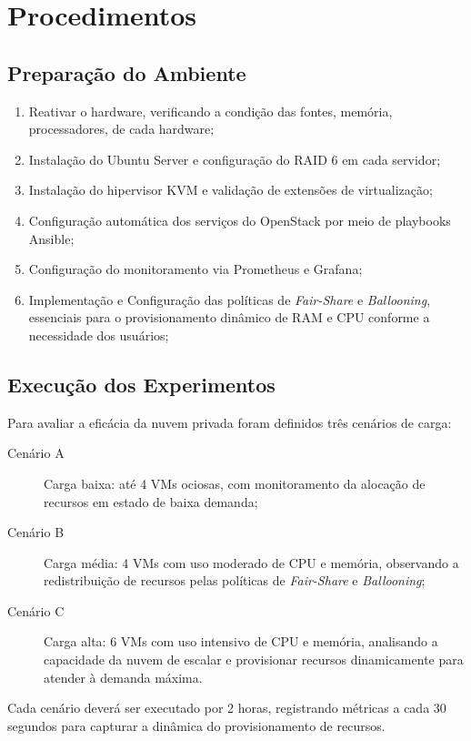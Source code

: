 \section{Procedimentos}
\subsection{Preparação do Ambiente}
\begin{enumerate}
    \item Reativar o hardware, verificando a condição das fontes, memória, processadores, de cada hardware;
    \item Instalação do Ubuntu Server e configuração do RAID 6 em cada servidor;
    \item Instalação do hipervisor KVM e validação de extensões de virtualização;
    \item Configuração automática dos serviços do OpenStack por meio de playbooks Ansible;
    \item Configuração do monitoramento via Prometheus e Grafana;
    \item Implementação e Configuração das políticas de \textit{Fair-Share} e \textit{Ballooning}, essenciais para o provisionamento dinâmico de RAM e CPU conforme a necessidade dos usuários;
\end{enumerate}

\subsection{Execução dos Experimentos}
Para avaliar a eficácia da nuvem privada foram definidos três cenários de carga:
\begin{description}
    \item[Cenário A] Carga baixa: até 4 VMs ociosas, com monitoramento da alocação de recursos em estado de baixa demanda;
    \item[Cenário B] Carga média: 4 VMs com uso moderado de CPU e memória, observando a redistribuição de recursos pelas políticas de \textit{Fair-Share} e \textit{Ballooning};
    \item[Cenário C] Carga alta: 6 VMs com uso intensivo de CPU e memória, analisando a capacidade da nuvem de escalar e provisionar recursos dinamicamente para atender à demanda máxima.
\end{description}
Cada cenário deverá ser executado por 2 horas, registrando métricas a cada 30 segundos para capturar a dinâmica do provisionamento de recursos.

